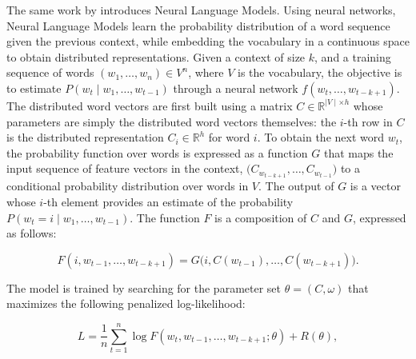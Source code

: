 

The same work by \citet{bengio2000neural} introduces Neural Language Models. Using neural networks, Neural Language Models learn the probability distribution of a word sequence given the previous context, while embedding the vocabulary in a continuous space to obtain distributed representations. Given a context of size $k$, and a training sequence of words $(w_1, \ldots, w_n) \in V^n$, where $V$ is the vocabulary, the objective is to estimate $P(w_t \mid w_1, \ldots, w_{t-1})$ through a neural network $f(w_t, \ldots, w_{t-k+1})$. The distributed word vectors are first built using a matrix $C \in \mathbb{R}^{\mid V \mid \times h}$ whose parameters are simply the distributed word vectors themselves: the $i$-th row in $C$ is the distributed representation $C_i \in \mathbb{R}^h$ for word $i$. To obtain the next word $w_t$, the probability function over words is expressed as a function $G$ that maps the input sequence of feature vectors in the context, $\bigl(C_{w_{t-k+1}}, \ldots, C_{w_{t-1}}\bigr)$ to a conditional probability distribution over words in $V$. The output of $G$ is a vector whose $i$-th element provides an estimate of the probability $P(w_t = i \mid w_1, \ldots, w_{t-1})$. The function $F$ is a composition of $C$ and $G$, expressed as follows:

\begin{equation}
    F(i, w_{t-1}, \ldots, w_{t-k+1}) = G\bigl(i, C(w_{t-1}), \ldots, C(w_{t-k+1})\bigr).
\label{eq:bengio}
\end{equation}

The model is trained by searching for the parameter set $\theta = (C, \omega)$ that maximizes the following penalized log-likelihood:

\begin{equation}
    L = \frac{1}{n} \sum_{t=1}^n \log F(w_t, w_{t-1}, \ldots, w_{t-k+1}; \theta) + R(\theta),
\label{eq:nlm-log-likelihood}
\end{equation}

